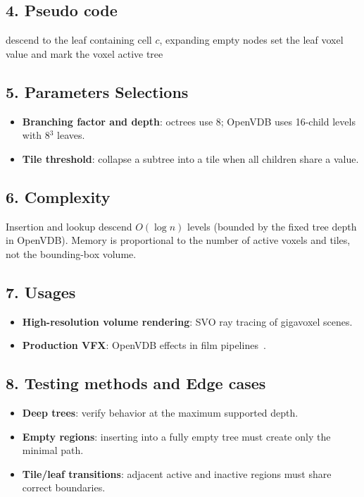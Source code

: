 \subsection{4. Pseudo code}
\begin{algorithmic}
    \State descend to the leaf containing cell $c$, expanding empty nodes
    \State set the leaf voxel value and mark the voxel active
    \State \Return tree
\EndFunction
\end{algorithmic}

\subsection{5. Parameters Selections}
\begin{itemize}
    \item \textbf{Branching factor and depth}: octrees use 8; OpenVDB uses 16-child levels with 8$^3$ leaves.
    \item \textbf{Tile threshold}: collapse a subtree into a tile when all children share a value.
\end{itemize}

\subsection{6. Complexity}
Insertion and lookup descend $O(\log n)$ levels (bounded by the fixed tree
depth in OpenVDB). Memory is proportional to the number of active voxels and
tiles, not the bounding-box volume.

\subsection{7. Usages}
\begin{itemize}
    \item \textbf{High-resolution volume rendering}: SVO ray tracing of gigavoxel scenes.
    \item \textbf{Production VFX}: OpenVDB effects in film pipelines~\cite{museth2013}.
\end{itemize}

\subsection{8. Testing methods and Edge cases}
\begin{itemize}
    \item \textbf{Deep trees}: verify behavior at the maximum supported depth.
    \item \textbf{Empty regions}: inserting into a fully empty tree must create only the minimal path.
    \item \textbf{Tile/leaf transitions}: adjacent active and inactive regions must share correct boundaries.
\end{itemize}

